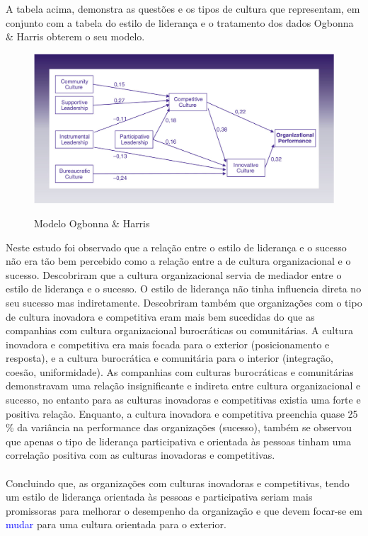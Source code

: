 A tabela acima, demonstra as questões e os tipos de cultura que representam, em conjunto com a tabela do estilo de liderança e o tratamento dos dados Ogbonna \& Harris obterem o seu modelo.
\begin{figure}[H]
\centering
\includegraphics[scale=.35]{./image/OB/Ogbonna_Harris.jpg}\\
\caption{Modelo Ogbonna \& Harris \cite{article_1}}
\label{Modelo}
\end{figure}\par
Neste estudo foi observado que a relação entre o estilo de liderança e o sucesso não era tão bem percebido como a relação entre a de cultura organizacional e o sucesso. Descobriram que a cultura organizacional servia de mediador entre o estilo de liderança e o sucesso. O estilo de liderança não tinha influencia direta no seu sucesso mas indiretamente. Descobriram também que organizações com o tipo de cultura inovadora e competitiva eram mais bem sucedidas do que as companhias com cultura organizacional burocráticas ou comunitárias. A cultura inovadora e competitiva era mais focada para o exterior (posicionamento e resposta), e a cultura burocrática e comunitária para o interior (integração, coesão, uniformidade). As companhias com culturas burocráticas e comunitárias demonstravam uma relação insignificante e indireta entre cultura organizacional e sucesso, no entanto para as culturas inovadoras e competitivas existia uma forte e positiva relação. Enquanto, a cultura inovadora e competitiva preenchia quase 25 \% da variância na performance das organizações (sucesso), também se observou que apenas o tipo de liderança participativa e orientada às pessoas tinham uma correlação positiva com as culturas inovadoras e competitivas.\\
\\
Concluindo que, as organizações com culturas inovadoras e competitivas, tendo um estilo de liderança orientada às pessoas e participativa seriam mais promissoras para melhorar o desempenho da organização e que devem focar-se em \textcolor{blue}{mudar} para uma cultura orientada para o exterior. \cite{article_1} \\
\newpage
